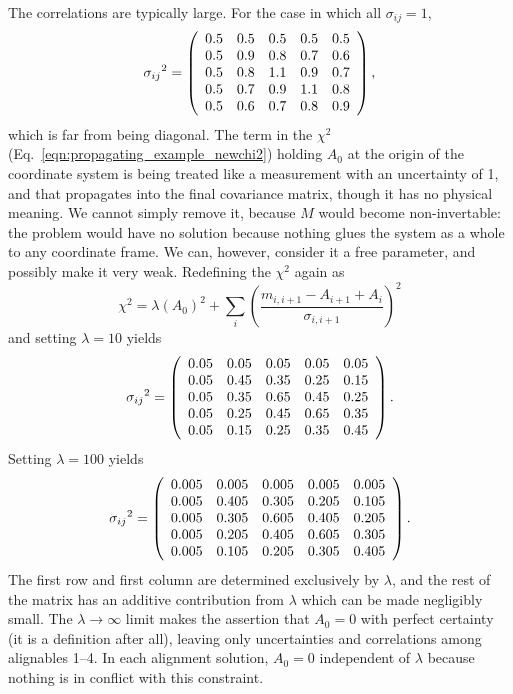 \documentclass[12pt]{article}
\begin{document}
The correlations are typically large.  For the case in which all
$\sigma_{ij} = 1$,
\begin{equation}
{\sigma_{ij}}^2 = \left(\begin{array}{c c c c c}
0.5 & 0.5 & 0.5 & 0.5 & 0.5 \\
0.5 & 0.9 & 0.8 & 0.7 & 0.6 \\
0.5 & 0.8 & 1.1 & 0.9 & 0.7 \\
0.5 & 0.7 & 0.9 & 1.1 & 0.8 \\
0.5 & 0.6 & 0.7 & 0.8 & 0.9 \end{array}\right),
\end{equation}
which is far from being diagonal.  The term in the $\chi^2$
(Eq.~\ref{eqn:propagating_example_newchi2}) holding $A_0$ at the
origin of the coordinate system is being treated like a measurement
with an uncertainty of 1, and that propagates into the final
covariance matrix, though it has no physical meaning.  We cannot
simply remove it, because $M$ would become non-invertable: the problem
would have no solution because nothing glues the system as a whole to
any coordinate frame.  We can, however, consider it a free parameter, and
possibly make it very weak.  Redefining the $\chi^2$ again as
\begin{equation}
\chi^2 = \lambda (A_0)^2 + \sum_i \left(\frac{m_{i,i+1} - A_{i+1} + A_i}{\sigma_{i,i+1}}\right)^2
\end{equation}
and setting $\lambda = 10$ yields
\begin{equation}
{\sigma_{ij}}^2 = \left(\begin{array}{c c c c c}
0.05 & 0.05 & 0.05 & 0.05 & 0.05 \\
0.05 & 0.45 & 0.35 & 0.25 & 0.15 \\
0.05 & 0.35 & 0.65 & 0.45 & 0.25 \\
0.05 & 0.25 & 0.45 & 0.65 & 0.35 \\
0.05 & 0.15 & 0.25 & 0.35 & 0.45 \end{array}\right).
\end{equation}
Setting $\lambda = 100$ yields
\begin{equation}
{\sigma_{ij}}^2 = \left(\begin{array}{c c c c c}
0.005 & 0.005 & 0.005 & 0.005 & 0.005 \\
0.005 & 0.405 & 0.305 & 0.205 & 0.105 \\
0.005 & 0.305 & 0.605 & 0.405 & 0.205 \\
0.005 & 0.205 & 0.405 & 0.605 & 0.305 \\
0.005 & 0.105 & 0.205 & 0.305 & 0.405 \end{array}\right).
\end{equation}
The first row and first column are determined exclusively by
$\lambda$, and the rest of the matrix has an additive contribution
from $\lambda$ which can be made negligibly small.  The $\lambda \to
\infty$ limit makes the assertion that $A_0 = 0$ with perfect
certainty (it is a definition after all), leaving only uncertainties
and correlations among alignables 1--4.  In each alignment solution,
$A_0 = 0$ independent of $\lambda$ because nothing is in conflict with
this constraint.
\end{document}
